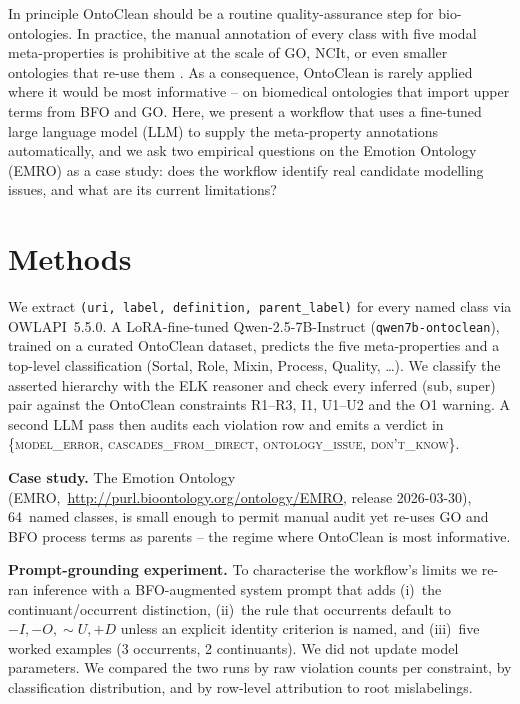 \documentclass[10pt,a4paper]{article}
\begin{document}
In principle OntoClean should be a routine quality-assurance step for
bio-ontologies. In practice, the manual annotation of every class with
five modal meta-properties is prohibitive at the scale of GO, NCIt, or
even smaller ontologies that re-use them
\citep{Guarino2002OntoClean,Welty2001Supporting}. As a consequence,
OntoClean is rarely applied where it would be most informative -- on
biomedical ontologies that import upper terms from BFO
\citep{Arp2015BFO} and GO. Here, we present a workflow that uses a
fine-tuned large language model (LLM) to supply the meta-property
annotations automatically, and we ask two empirical questions on the
Emotion Ontology (EMRO) as a case study: does the workflow identify
real candidate modelling issues, and what are its current limitations?

\section{Methods}
We extract \texttt{(uri, label, definition, parent\_label)} for every
named class via OWLAPI~5.5.0. A LoRA-fine-tuned Qwen-2.5-7B-Instruct
\citep{Yang2024Qwen25} (\texttt{qwen7b-ontoclean}), trained on a
curated OntoClean dataset, predicts the five meta-properties and a
top-level classification (Sortal, Role, Mixin, Process, Quality,
\dots). We classify the asserted hierarchy with the ELK reasoner
\citep{Kazakov2014ELK} and check every inferred (sub, super) pair
against the OntoClean constraints R1--R3, I1, U1--U2 and the O1
warning. A second LLM pass then audits each violation row and emits a
verdict in \{\textsc{model\_error}, \textsc{cascades\_from\_direct},
\textsc{ontology\_issue}, \textsc{don't\_know}\}.

\textbf{Case study.} The Emotion Ontology
(EMRO,~\url{http://purl.bioontology.org/ontology/EMRO}, release
2026-03-30), 64~named classes, is small enough to permit manual audit
yet re-uses GO and BFO process terms as parents -- the regime where
OntoClean is most informative.

\textbf{Prompt-grounding experiment.} To characterise the workflow's
limits we re-ran inference with a BFO-augmented system prompt that
adds (i)~the continuant/occurrent distinction, (ii)~the rule that
occurrents default to $-I,-O,\sim\!U,+D$ unless an explicit identity
criterion is named, and (iii)~five worked examples (3 occurrents, 2
continuants). We did not update model parameters. We compared the two
runs by raw violation counts per constraint, by classification
distribution, and by row-level attribution to root mislabelings.
\end{document}
